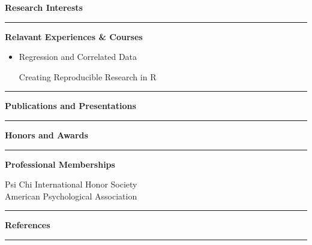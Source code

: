\documentclass[12pt]{article} %
\newenvironment{highlightsforbulletentries}{
    \begin{itemize}[
        topsep=0.10 cm,
        parsep=0.10 cm,
        partopsep=0pt,
        itemsep=0pt,
        leftmargin=10pt
    ]
}{
    \end{itemize}
} %
\begin{document}

{\fontsize{13}{12}\selectfont \textbf{Research Interests}\\} %

\vspace{-.3in}

\rule{\textwidth}{0.05pt}

{\fontsize{13}{12}\selectfont \textbf{Relavant Experiences \& Courses}\\} %

\vspace{-1.5em}

\begin{highlightsforbulletentries}
    \item \begin{minipage}[t]{0.45\textwidth}Regression and Correlated Data\end{minipage}%
    \hfill
    \begin{minipage}[t]{0.45\textwidth}Creating Reproducible Research in R\end{minipage}
\end{highlightsforbulletentries}

\vspace{-.3in}

\rule{\textwidth}{0.05pt}


{\fontsize{13}{12}\selectfont \textbf{Publications and Presentations}\\} %

\vspace{-.3in}

\rule{\textwidth}{0.05pt}


{\fontsize{13}{12}\selectfont \textbf{Honors and Awards}\\} %

\vspace{-.3in}

\rule{\textwidth}{0.05pt}


{\fontsize{13}{12}\selectfont \textbf{Professional Memberships}\\} %

\vspace{-.20in}

Psi Chi International Honor Society \\
American Psychological Association

\rule{\textwidth}{0.05pt}


{\fontsize{13}{12}\selectfont \textbf{References}\\} %

\vspace{-.3in}

\rule{\textwidth}{0.05pt}
\end{document}
